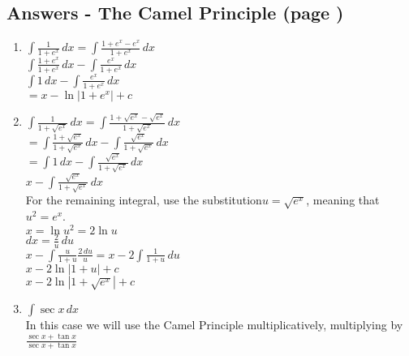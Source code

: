 \documentclass[../main.tex]{subfiles}
\begin{document}
\subsection*{Answers - The Camel Principle (page \pageref{Camel Principle})}

\begin{enumerate}
    \item 
    \(\int \frac{1}{1+e^x}\,dx=\int \frac{1+e^x-e^x}{1+e^x}\,dx\)\\
    
    \(\int \frac{1+e^x}{1+e^x}\,dx-\int \frac{e^x}{1+e^x}\,dx\)\\

    \(\int 1\,dx-\int \frac{e^x}{1+e^x}\,dx\)\\

    \(=x-\ln{|1+e^x|}+c\)\\
    
    \item 
    \(\int \frac{1}{1+\sqrt{e^x}}\,dx=\int \frac{1+\sqrt{e^x}-\sqrt{e^x}}{1+\sqrt{e^x}}\,dx\)\\

    \(=\int \frac{1+\sqrt{e^x}}{1+\sqrt{e^x}}\,dx-\int \frac{\sqrt{e^x}}{1+\sqrt{e^x}}\,dx\)\\

    \(=\int 1\,dx-\int \frac{\sqrt{e^x}}{1+\sqrt{e^x}}\,dx\)\\

    \(x-\int \frac{\sqrt{e^x}}{1+\sqrt{e^x}}\,dx\)\\

    For the remaining integral, use the substitution\(u=\sqrt{e^x}\), meaning that \(u^2=e^x\).\\

    \(x=\ln{u^2}=2\ln{u}\)\\

    \(dx=\frac{2}{u}\,du\)\\

    \(x-\int \frac{u}{1+u}\frac{2\,du}{u}=x-2\int \frac{1}{1+u}\,du\)\\

    \(x-2\ln{|1+u|}+c\)\\

    \(x-2\ln{|1+\sqrt{e^x}|}+c\)\\
    
    \item 
    \(\int \sec{x}\,dx\)\\
    In this case we will use the Camel Principle multiplicatively, multiplying by \(\frac{\sec{x}+\tan{x}}{\sec{x}+\tan{x}}\)\\


\end{enumerate}
\end{document}
